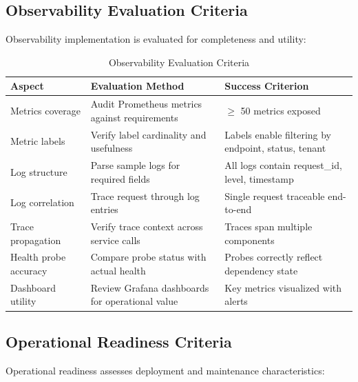 \subsection{Observability Evaluation Criteria}
\label{subsec:observability-criteria}

Observability implementation is evaluated for completeness and utility:

\begin{table}[htbp]
\centering
\caption{Observability Evaluation Criteria}
\label{tab:observability-eval}
\small
\begin{tabularx}{\textwidth}{|l|X|l|}
\hline
\textbf{Aspect} & \textbf{Evaluation Method} & \textbf{Success Criterion} \\
\hline
Metrics coverage & Audit Prometheus metrics against requirements & $\geq$ 50 metrics exposed \\
\hline
Metric labels & Verify label cardinality and usefulness & Labels enable filtering by endpoint, status, tenant \\
\hline
Log structure & Parse sample logs for required fields & All logs contain request\_id, level, timestamp \\
\hline
Log correlation & Trace request through log entries & Single request traceable end-to-end \\
\hline
Trace propagation & Verify trace context across service calls & Traces span multiple components \\
\hline
Health probe accuracy & Compare probe status with actual health & Probes correctly reflect dependency state \\
\hline
Dashboard utility & Review Grafana dashboards for operational value & Key metrics visualized with alerts \\
\hline
\end{tabularx}
\end{table}

\subsection{Operational Readiness Criteria}
\label{subsec:operational-criteria}

Operational readiness assesses deployment and maintenance characteristics:

